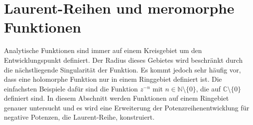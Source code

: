 %
%
%
\section{Laurent-Reihen und meromorphe Funktionen
\label{buch:analytisch:section:laurentreihen}}
Analytische Funktionen sind immer auf einem Kreisgebiet um den
Entwicklungspunkt definiert.
Der Radius dieses Gebietes wird beschränkt durch die nächstliegende
Singularität der Funktion.
Es kommt jedoch sehr häufig vor, dass eine holomorphe Funktion
nur in einem Ringgebiet definiert ist.
Die einfachsten Beispiele dafür sind die Funktion $z^{-n}$ mit
$n\in\mathbb{N}\setminus\{0\}$, die auf $\mathbb{C}\setminus\{0\}$
definiert sind.
In diesem Abschnitt werden Funktionen auf einem Ringebiet genauer
untersucht und es wird eine Erweiterung der Potenzreihenentwicklung
für negative Potenzen, die Laurent-Reihe, konstruiert.







